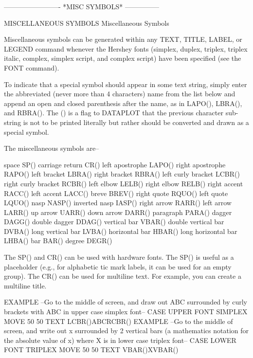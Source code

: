  
 
 
-------------------------  *MISC SYMBOLS*  ---------------
 
MISCELLANEOUS SYMBOLS
Miscellaneous Symbols
 
Miscellaneous symbols can be generated within any TEXT, TITLE, LABEL,
or LEGEND command whenever the Hershey fonts (simplex, duplex, triplex,
triplex italic, complex, simplex script, and complex script) have been
specified (see the FONT command).
 
To indicate that a special symbol should appear in some text string,
simply enter the abbreviated (never more than 4 characters) name from
the list below and append an open and closed parenthesis after the
name, as in LAPO(), LBRA(), and RBRA().  The () is a flag to DATAPLOT
that the previous character sub-string is not to be printed literally
but rather should be converted and drawn as a special symbol.
 
The miscellaneous symbols are--
 
   space                    SP()
   carriage return          CR()
   left apostrophe          LAPO()
   right apostrophe         RAPO()
   left bracket             LBRA()
   right bracket            RBRA()
   left curly bracket       LCBR()
   right curly bracket      RCBR()
   left elbow               LELB()
   right elbow              RELB()
   right accent             RACC()
   left accent              LACC()
   breve                    BREV()
   right quote              RQUO()
   left quote               LQUO()
   nasp                     NASP()
   inverted nasp            IASP()
   right arrow              RARR()
   left arrow               LARR()
   up arrow                 UARR()
   down arrow               DARR()
   paragraph                PARA()
   dagger                   DAGG()
   double dagger            DDAG()
   vertical bar             VBAR()
   double vertical bar      DVBA()
   long vertical bar        LVBA()
   horizontal bar           HBAR()
   long horizontal bar      LHBA()
   bar                      BAR()
   degree                   DEGR()
 
The SP() and CR() can be used with hardware fonts.  The SP()
is useful as a placeholder (e.g., for alphabetic tic mark labels,
it can be used for an empty group).  The CR() can be used for
multiline text.  For example, you can create a multiline title.

EXAMPLE --Go to the middle of screen, and draw out ABC surrounded by
          curly brackets with ABC in upper case simplex font--
             CASE UPPER
             FONT SIMPLEX
             MOVE 50 50
             TEXT LCBR()ABCRCBR()
EXAMPLE --Go to the middle of screen, and write out x surrounded by 2
          vertical bars (a mathematics notation for the absolute value
          of x) where X is in lower case triplex font--
             CASE LOWER
             FONT TRIPLEX
             MOVE 50 50
             TEXT VBAR()XVBAR()
 
